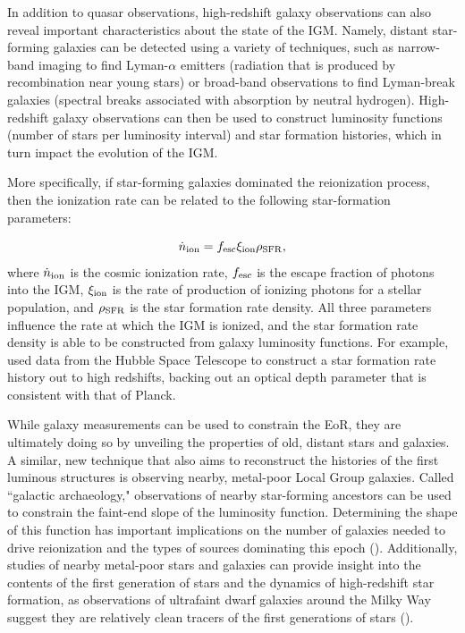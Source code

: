 In addition to quasar observations, high-redshift galaxy observations can also reveal important characteristics about the state of the IGM. Namely, distant star-forming galaxies can be detected using a variety of techniques, such as narrow-band imaging to find Lyman-$\alpha$ emitters (radiation that is produced by recombination near young stars) or broad-band observations to find Lyman-break galaxies (spectral breaks associated with absorption by neutral hydrogen). High-redshift galaxy observations can then be used to construct luminosity functions (number of stars per luminosity interval) and star formation histories, which in turn impact the evolution of the IGM. 

More specifically, if star-forming galaxies dominated the reionization process, then the ionization rate can be related to the following star-formation parameters:

\begin{equation}
\dot{n}_{\rm ion} = f_{\rm esc}\xi_{\rm ion}\rho_{\rm SFR},
\end{equation}
where $\dot{n}_{\rm ion}$ is the cosmic ionization rate, $f_{\rm esc}$ is the escape fraction of photons into the IGM, $\xi_{\rm ion}$ is the rate of production of ionizing photons for a stellar population, and $\rho_{\rm SFR}$ is the star formation rate density. All three parameters influence the rate at which the IGM is ionized, and the star formation rate density is able to be constructed from galaxy luminosity functions. For example, \citet{robertson_et_al2015} used data from the Hubble Space Telescope to construct a star formation rate history out to high redshifts, backing out an optical depth parameter that is consistent with that of Planck. 

While galaxy measurements can be used to constrain the EoR, they are ultimately doing so by unveiling the properties of old, distant stars and galaxies. A similar, new technique that also aims to reconstruct the histories of the first luminous structures is observing nearby, metal-poor Local Group galaxies. Called ``galactic archaeology," observations of nearby star-forming ancestors can be used to constrain the faint-end slope of the luminosity function. Determining the shape of this function has important implications on the number of galaxies needed to drive reionization and the types of sources dominating this epoch (\citealt{weisz2017}). Additionally, studies of nearby metal-poor stars and galaxies can provide insight into the contents of the first generation of stars and the dynamics of high-redshift star formation, as observations of ultrafaint dwarf galaxies around the Milky Way suggest they are relatively clean tracers of the first generations of stars (\citealt{loeb_furlanetto_2013}).

